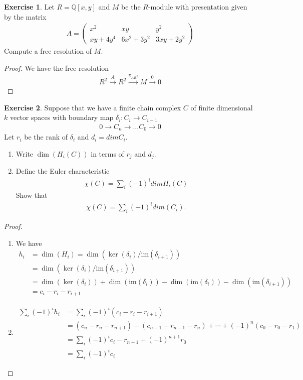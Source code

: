 \documentclass[12pt]{extarticle}
\newcommand{\im}{\text{im}}
\newcommand{\Q}{\mathbb{Q}}
\newcommand{\<}{\langle}
\renewcommand{\>}{\rangle}
\theoremstyle{definition}
\newtheorem{exercise}{Exercise}
\begin{document}
\begin{exercise}
  Let $R= \Q[x,y]$ and $M$ be the $R$-module with presentation given by the matrix
  \begin{align*}
    A =
    \begin{pmatrix}
      x^2     & xy          & y^2 \\
      xy+4y^4 & 6x^2 + 3y^2 & 3xy + 2y^2  
    \end{pmatrix}
  \end{align*}
  Compute a free resolution of $M$.
\end{exercise}
\begin{proof}
  We have the free resolution
  \begin{align*}
    R^2 \xrightarrow{A} R^2 \xrightarrow{\pi_{AR^2}} M \xrightarrow{0} 0 
  \end{align*}
\end{proof}
\begin{exercise}
  Suppose that we have a finite chain complex $C$ of finite dimensional $k$ vector spaces with boundary map $\delta_i: C_i \to C_{i-1}$
  \begin{align*}
    0 \to C_n \to \dots C_0 \to 0
  \end{align*}
  Let $r_i$ be the rank of $\delta_i$ and $d_i = dim C_i $.
    \begin{enumerate}
    \item
      Write $\dim(H_i(C))$ in terms of $r_j$ and $d_j$.
    \item
      Define the Euler characteristic
      \begin{align*}
        \chi(C) = \sum\limits_{i} (-1)^i dim H_i(C)
      \end{align*}
      Show that
      \begin{align*}
        \chi(C) = \sum\limits_{i} (-1)^i dim (C_i).
      \end{align*}
    \end{enumerate}
\end{exercise}
\begin{proof}
  \begin{enumerate}
  \item
    We have 
    \begin{align*}
      h_i
      &= \dim(H_i) = \dim (\ker(\delta_i)/\im(\delta_{i+1})) \\
      &= \dim (\ker(\delta_i)/\im(\delta_{i+1})) \\
      &= \dim (\ker(\delta_i)) + \dim(\im(\delta_i)) - \dim(\im(\delta_i)) - \dim(\im(\delta_{i+1}))  \\
      &=  c_i - r_i - r_{i+1}
    \end{align*}
  \item
    \begin{align*}
      \sum\limits_i (-1)^i h_i &= \sum\limits_i (-1)^i (c_i - r_i - r_{i+1})  \\
      &= (c_n - r_n - r_{n+1}) - (c_{n-1} - r_{n-1} - r_n) + \cdots + (-1)^n(c_0 - r_0 - r_1) \\
      &= \sum \limits_i (-1)^i c_i - r_{n+1} + (-1)^{n+1} r_0 \\
      &= \sum \limits_i (-1)^i c_i
    \end{align*}
  \end{enumerate}
\end{proof}
\end{document}
